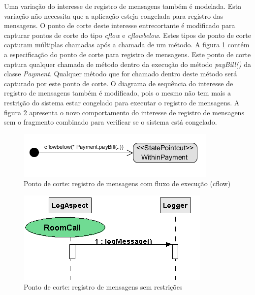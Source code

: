 Uma variação do interesse de registro de mensagens também é modelada. Esta variação não necessita que a aplicação esteja congelada para registro
das mensagens. O ponto de corte deste interesse entrecortante é modificado para capturar pontos de corte do tipo \textit{cflow} e \textit{cflowbelow}.
Estes tipos de ponto de corte capturam múltiplas chamadas após a chamada de um método. A figura \ref{fig:case_study_behavioral_pointcut_log_2} contém a 
especificação do ponto de corte para registro de mensagens. Este ponto de corte captura qualquer chamada de método dentro da execução do método
\textit{payBill()} da classe \textit{Payment}. Qualquer método que for chamado dentro deste método será capturado por este ponto de corte. 
O diagrama de sequência do interesse de registro de mensagens também é modificado, pois o mesmo não tem mais a restrição do sistema estar congelado
para executar o registro de mensagens. A figura \ref{fig:case_study_behavioral_log_2} apresenta o novo comportamento do interesse de registro de mensagens 
sem o fragmento combinado para verificar se o sistema está congelado.

  \begin{figure}[!h]
	\centering
	\includegraphics{img/case_study_behavioral_pointcut_log_2.png}
	\caption{Ponto de corte: registro de mensagens com fluxo de execução (cflow)}\label{fig:case_study_behavioral_pointcut_log_2}
  \end{figure}

  \begin{figure}[!h]
	\centering
	\includegraphics{img/case_study_behavioral_log_2.png}
	\caption{Ponto de corte: registro de mensagens sem restrições}\label{fig:case_study_behavioral_log_2}
  \end{figure}
  

